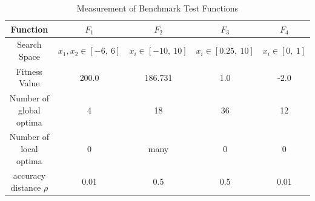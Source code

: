 \documentclass[conference]{IEEEtran}
\begin{document}
\begin{table}[h]
\caption{Measurement of Benchmark Test Functions}
\begin{center}
\begin{tabular}{c|c|c|c|c}
\hline
Function & ${F_1}$ & ${F_2}$ & ${F_3}$ & ${F_4}$ \\
\hline
Search Space & $x_1, x_2 \in [-6, \ 6]$ & $x_i \in [-10, \ 10]$ & $x_i \in [0.25, \ 10]$ & $x_i \in [0, \ 1]$\\
\hline
Fitness Value & 200.0 & 186.731 & 1.0 & -2.0   \\
\hline
Number of global optima & 4 & 18 & 36 & 12 \\
\hline
Number of local optima &  0 & many & 0 & 0  \\
\hline
accuracy distance $\rho$ & 0.01 & 0.5 & 0.5 & 0.01 \\
\hline
\end{tabular}
\label{tab1}
\end{center}
\end{table}
\end{document}
